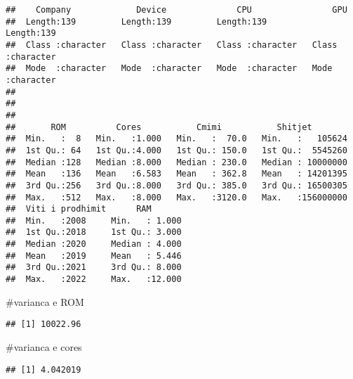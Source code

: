 \documentclass[
]{article}
\newenvironment{Shaded}{\begin{snugshade}}{\end{snugshade}}
\newcommand{\FunctionTok}[1]{\textcolor[rgb]{0.00,0.00,0.00}{#1}}
\newcommand{\NormalTok}[1]{#1}
\newcommand{\SpecialCharTok}[1]{\textcolor[rgb]{0.00,0.00,0.00}{#1}}
\begin{document}
\begin{verbatim}
##    Company             Device              CPU                GPU           
##  Length:139         Length:139         Length:139         Length:139        
##  Class :character   Class :character   Class :character   Class :character  
##  Mode  :character   Mode  :character   Mode  :character   Mode  :character  
##                                                                             
##                                                                             
##                                                                             
##       ROM          Cores           Cmimi           Shitjet         
##  Min.   :  8   Min.   :1.000   Min.   :  70.0   Min.   :   105624  
##  1st Qu.: 64   1st Qu.:4.000   1st Qu.: 150.0   1st Qu.:  5545260  
##  Median :128   Median :8.000   Median : 230.0   Median : 10000000  
##  Mean   :136   Mean   :6.583   Mean   : 362.8   Mean   : 14201395  
##  3rd Qu.:256   3rd Qu.:8.000   3rd Qu.: 385.0   3rd Qu.: 16500305  
##  Max.   :512   Max.   :8.000   Max.   :3120.0   Max.   :156000000  
##  Viti i prodhimit      RAM        
##  Min.   :2008     Min.   : 1.000  
##  1st Qu.:2018     1st Qu.: 3.000  
##  Median :2020     Median : 4.000  
##  Mean   :2019     Mean   : 5.446  
##  3rd Qu.:2021     3rd Qu.: 8.000  
##  Max.   :2022     Max.   :12.000
\end{verbatim}

\#varianca e ROM

\begin{Shaded}
\end{Shaded}

\begin{verbatim}
## [1] 10022.96
\end{verbatim}

\#varianca e cores

\begin{Shaded}
\end{Shaded}

\begin{verbatim}
## [1] 4.042019
\end{verbatim}
\end{document}
